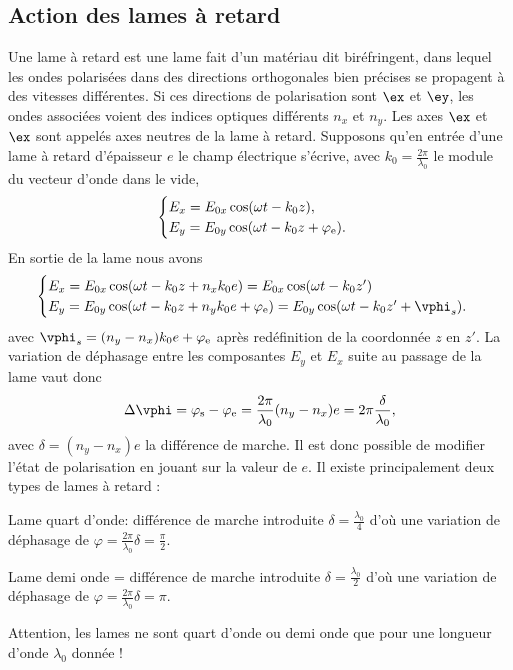 \subsection{Action des lames à retard}


Une lame à retard est une lame fait d'un matériau dit biréfringent, dans lequel les ondes polarisées dans des directions orthogonales bien précises se propagent à des vitesses différentes. Si ces directions de polarisation sont $\ex$ et $\ey$,  les ondes associées voient des indices optiques différents $n_x$ et $n_y$. Les axes $\ex$ et $\ex$ sont appelés axes neutres de la lame à retard. Supposons qu'en entrée d'une lame à retard d'épaisseur $e$ le champ électrique s'écrive, avec $k_0=\frac{2\pi}{\lambda_0}$ le module du vecteur d'onde dans le vide,
\begin{equation}
\begin{cases}
E_x=E_{0x}\cos(\omega t-k_{0}z), \\
E_y=E_{0y}\cos(\omega t-k_{0}z+\varphi_{\rm{e}}).
\end{cases}
\end{equation}
En sortie de la lame nous avons
\begin{equation}
\begin{cases}
E_x=E_{0x}\cos(\omega t-k_{0}z+n_x k_{0}e) = E_{0x}\cos(\omega t-k_{0}z') \\
E_y=E_{0y}\cos(\omega t-k_{0}z+n_y k_{0}e+\varphi_{\rm{e}}) = E_{0y}\cos(\omega t-k_{0}z'+\vphi_s) .
\end{cases}
\end{equation}
avec $\vphi_s = (n_y-n_x) k_{0}e+\varphi_{\rm{e}}$ après redéfinition de la coordonnée $z$ en $z'$.
La variation de déphasage entre les composantes $E_{y}$ et $E_{x}$ suite au passage de la lame vaut donc
\begin{equation}
\Delta \vphi = \varphi_{\rm{s}} - \varphi_{\rm{e}} = \frac{2\pi}{\lambda_0}(n_y-n_x)e = 2\pi\frac{\delta}{\lambda_0},
\end{equation}
avec $\delta=(n_y-n_x)e$ la différence de marche. Il est donc possible de modifier l'état de polarisation en jouant sur la valeur de $e$. Il existe principalement deux types de lames à retard :
\begin{liste}
  \item Lame quart d'onde: différence de marche introduite $\delta=\frac{\lambda_0}{4}$ d'où une variation de déphasage de $\varphi=\frac{2\pi}{\lambda_0}\delta=\frac{\pi}{2}$.
\item Lame demi onde = différence de marche introduite $\delta=\frac{\lambda_0}{2}$ d'où une variation de déphasage de $\varphi=\frac{2\pi}{\lambda_0}\delta=\pi$.
\end{liste}
Attention, les lames ne sont quart d'onde ou demi onde que pour une longueur d'onde $\lambda_0$ donnée !


